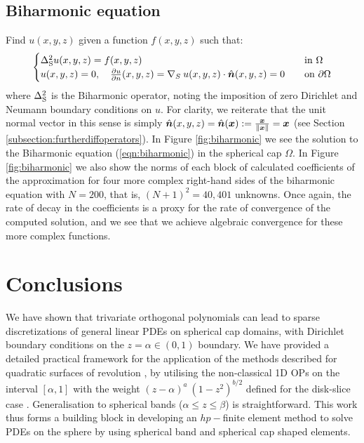\documentclass[11pt, oneside]{article}   	%
\begin{document}
\subsection{Biharmonic equation}

Find $u(x,y,z)$ given a function $f(x,y,z)$ such that:
\begin{align}
	\begin{cases}
    		\Delta_{\rm S}^2 u(x,y,z) = f(x,y,z) &\quad \text{in } \Omega \\
		u(x,y,z) = 0, \quad \frac{\partial u}{\partial n}(x,y,z) = \nabla_S \: u(x,y,z) \cdot \hat{\bm{n}}(x,y,z) = 0 &\quad \text{on } \partial \Omega
	\end{cases}
	\label{eqn:biharmonic}
\end{align}
where $\Delta_{\rm S}^2$ is the Biharmonic operator, noting the imposition of zero Dirichlet and Neumann boundary conditions on $u$. For clarity, we reiterate that the unit normal vector in this sense is simply $\hat{\bm{n}}(x,y,z) = \hat{\bm{n}}(\bm{x}) := {\bm{x} \over \left\| \bm{x} \right\|} = \bm{x}$ (see Section \ref{subsection:furtherdiffoperators}). In Figure \ref{fig:biharmonic} we see the solution to the Biharmonic equation (\ref{eqn:biharmonic}) in the spherical cap $\Omega$. In Figure \ref{fig:biharmonic} we also show the norms of each block of calculated coefficients of the approximation for four more complex right-hand sides of the biharmonic equation with $N = 200$, that is, $(N+1)^2 = 40,401$ unknowns. Once again, the rate of decay in the coefficients is a proxy for the rate of convergence of the computed solution, and we see that we achieve algebraic convergence for these more complex functions.



%
\section{Conclusions}

We have shown that trivariate orthogonal polynomials can lead to sparse discretizations of general linear PDEs on spherical cap domains, with Dirichlet boundary conditions on the $z = \alpha \in (0,1)$ boundary. We have provided a detailed practical framework for the application of the methods described for quadratic surfaces of revolution \cite{olver2020orthogonal}, by utilising the non-classical 1D OPs on the interval $[\alpha, 1]$ with the weight $(z - \alpha)^a \: (1-z^2)^{b/2}$ defined for the disk-slice case \cite{snowball2019sparse}. Generalisation to spherical bands ($\alpha \leq z \leq \beta$) is straightforward.  This work thus forms a building block in developing an $hp-$finite element method to solve PDEs on the sphere by using spherical band and spherical cap shaped elements.
\end{document}
